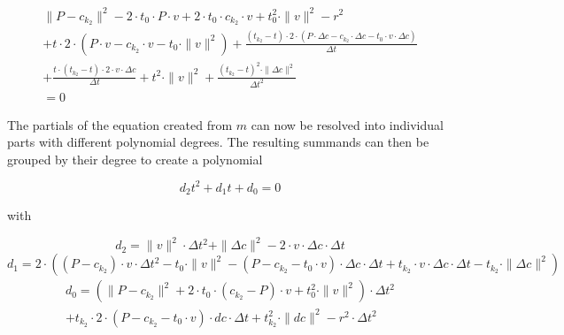 \begin{equation*}
    \begin{split}
        \|P - c_{k_2}\|^2
        - 2 \cdot t_0 \cdot P \cdot v
        + 2 \cdot t_0 \cdot c_{k_2} \cdot v
        + t_0^2 \cdot \|v\|^2
        - r^2
        \\
        + t \cdot 2 \cdot (P \cdot v - c_{k_2} \cdot v - t_0 \cdot \|v\|^2)
        + \frac{(t_{k_2} - t) \cdot
            2 \cdot (P \cdot \Delta c - c_{k_2} \cdot \Delta c - t_0 \cdot v \cdot \Delta c)
        }{\Delta t}
        \\
        + \frac{t \cdot (t_{k_2} - t) \cdot 2 \cdot v \cdot \Delta c}{\Delta t}
        + t^2 \cdot \|v\|^2
        + \frac{{(t_{k_2} - t)}^2 \cdot \|\Delta c\|^2}{\Delta t^2}
        \\
        = 0
    \end{split}
\end{equation*}

The partials of the equation created from \(m\) can now be resolved into individual parts with different polynomial degrees.
The resulting summands can then be grouped by their degree to create a polynomial

\begin{equation}\label{SpherePoly}
    d_2t^2 + d_1t + d_0 = 0
\end{equation}

with

\begin{equation}
    d_2 = \|v\|^2 \cdot \Delta t^2
    + \|\Delta c\|^2
    - 2 \cdot v \cdot \Delta c \cdot \Delta t
\end{equation}
\begin{equation}
    d_1 = 2 \cdot (
    (P - c_{k_2}) \cdot v \cdot \Delta t^2
    - t_0 \cdot \|v\|^2
    - (P - c_{k_2} - t_0 \cdot v) \cdot \Delta c \cdot \Delta t
    + t_{k_2} \cdot v \cdot \Delta c \cdot \Delta t
    - t_{k_2} \cdot \|\Delta c\|^2
    )
\end{equation}
\begin{equation}
    \begin{split}
        d_0 = (
        \|P - c_{k_2}\|^2
        + 2 \cdot t_0 \cdot (c_{k_2} - P) \cdot v
        + t_0^2 \cdot \|v\|^2
        ) \cdot \Delta t^2
        \\
        + t_{k_2} \cdot 2 \cdot (P - c_{k_2} - t_0 \cdot v) \cdot dc \cdot \Delta t
        + t_{k_2}^2 \cdot \|dc\|^2
        - r^2 \cdot \Delta t^2
    \end{split}
\end{equation}

